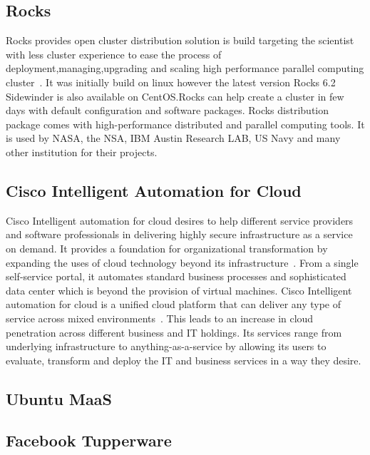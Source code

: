      \pv

\subsection{Rocks}

Rocks provides open cluster distribution solution is build targeting
the scientist with less cluster experience to ease the process of
deployment,managing,upgrading and scaling high performance parallel
computing cluster~\cite{www-rockscluster}.  It was initially build on
linux however the latest version Rocks 6.2 Sidewinder is also
available on CentOS.Rocks can help create a cluster in few days with
default configuration and software packages.  Rocks distribution
package comes with high-performance distributed and parallel computing
tools. It is used by NASA, the NSA, IBM Austin Research LAB, US Navy
and many other institution for their projects.

     \pv

\subsection{Cisco Intelligent Automation for Cloud}

Cisco Intelligent automation for cloud desires to help different
service providers and software professionals in delivering highly
secure infrastructure as a service on demand. It provides a foundation
for organizational transformation by expanding the uses of cloud
technology beyond its infrastructure~\cite{cis1}. From a single
self-service portal, it automates standard business processes and
sophisticated data center which is beyond the provision of virtual
machines. Cisco Intelligent automation for cloud is a unified cloud
platform that can deliver any type of service across mixed
environments~\cite{cis2}. This leads to an increase in cloud
penetration across different business and IT holdings. Its services
range from underlying infrastructure to anything-as-a-service by
allowing its users to evaluate, transform and deploy the IT and
business services in a way they desire.

\subsection{Ubuntu MaaS}

\pv

\subsection{Facebook Tupperware}

